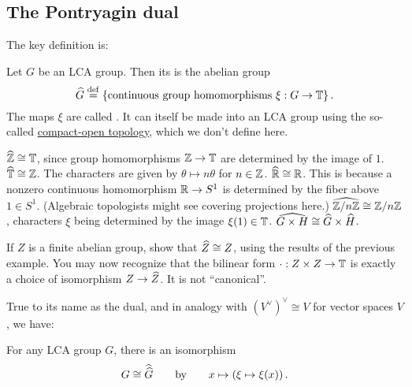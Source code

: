 \subsection{The Pontryagin dual}
The key definition is:
\begin{definition}
	Let $G$ be an LCA group.
	Then its  is the abelian group
	\[ \widehat G \overset{\mathrm{def}}{=} \left\{ \text{continuous group homomorphisms }
			\xi : G \to \mathbb T \right\}. \]
	The maps $\xi$ are called .
	It can itself be made into an LCA group
	using the so-called
	\href{https://en.wikipedia.org/wiki/Compact-open_topology}{compact-open topology},
	which we don't define here.
\end{definition}
\begin{example}
	\listhack
	\begin{itemize}
		\ii $\widehat{\mathbb Z} \cong \mathbb T$,
		since group homomorphisms $\mathbb Z \to \mathbb T$ are determined by the image of $1$.
		\ii $\widehat{\mathbb T} \cong \mathbb Z$.
		The characters are given by $\theta \mapsto n\theta$ for $n \in \mathbb Z$.
		\ii $\widehat{\mathbb R} \cong \mathbb R$.
		This is because a nonzero continuous homomorphism
		$\mathbb R \to S^1$ is determined by the fiber above $1 \in S^1$.
		(Algebraic topologists might see covering projections here.)
		\ii $\widehat{\mathbb Z/n\mathbb Z} \cong \mathbb Z/n\mathbb Z$,
		characters $\xi$ being determined by the image $\xi(1) \in \mathbb T$.
		\ii $\widehat{G \times H} \cong \widehat G \times \widehat H$.
	\end{itemize}
\end{example}
\begin{exercise}
	If $Z$ is a finite abelian group, show that $\widehat Z \cong Z$,
	using the results of the previous example.
	You may now recognize that the bilinear form
	$\cdot : Z \times Z \to \mathbb T$
	is exactly a choice of isomorphism $Z \to \widehat Z$.
	It is not ``canonical''.
\end{exercise}


True to its name as the dual,
and in analogy with $(V^\vee)^\vee \cong V$ for vector spaces $V$, we have:
\begin{theorem}
	For any LCA group $G$, there is an isomorphism
	\[ G \cong \widehat{\widehat G} \qquad \text{by} \qquad
		x \mapsto \left( \xi \mapsto \xi(x) \right). \]
\end{theorem}

